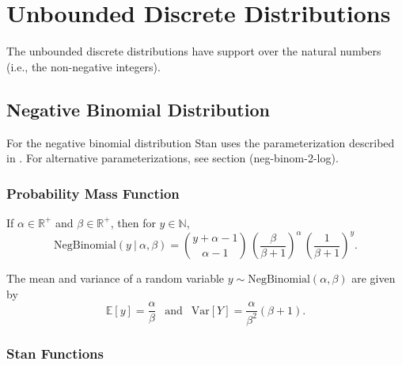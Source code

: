\begin{description}
{\begin{description}
\begin{description}     \end{description}


\chapter{Unbounded Discrete Distributions}


The unbounded discrete distributions have support over the natural numbers (i.e., the non-negative integers).


\section{Negative Binomial Distribution}


For the negative binomial distribution Stan uses the parameterization described in \citet{GelmanEtAl:2013}.  For alternative parameterizations, see section \@ref(neg-binom-2-log).


\subsection{Probability Mass Function}


If $\alpha \in \mathbb{R}^+$ and $\beta \in \mathbb{R}^+$, then for $y \in \mathbb{N}$, \[ \text{NegBinomial}(y~|~\alpha,\beta)  = \binom{y + \alpha - 1}{\alpha - 1} \, \left( \frac{\beta}{\beta+1} \right)^{\!\alpha} \, \left( \frac{1}{\beta + 1} \right)^{\!y} \!. \] 

The mean and variance of a random variable $y \sim \text{NegBinomial}(\alpha,\beta)$ are given by \[ \mathbb{E}[y] = \frac{\alpha}{\beta} \ \ \text{ and } \ \ \text{Var}[Y] = \frac{\alpha}{\beta^2} (\beta + 1). \] 



\subsection{Stan Functions}



\end{description}}
\end{description}
